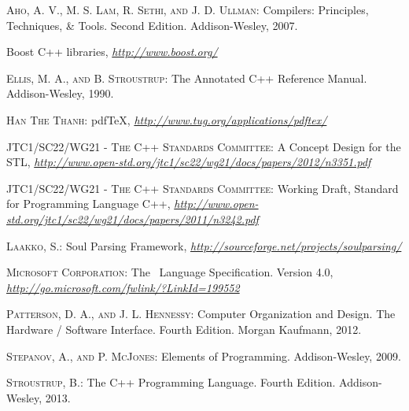 \documentclass[a4paper,oneside,11pt]{article}
\begin{document}
\begin{thebibliography}{13}

 \textsc{Aho, A. V., M. S. Lam, R. Sethi, and J. D. Ullman}:
Compilers: Principles, Techniques, \& Tools. Second Edition. Addison-Wesley, 2007.

 Boost C++ libraries,
\textit{\url{http://www.boost.org/}}

 \textsc{Ellis, M. A., and B. Stroustrup}:
The Annotated C++ Reference Manual. Addison-Wesley, 1990.

 \textsc{Han The Thanh}:
pdf\TeX, \textit{\url{http://www.tug.org/applications/pdftex/}}

 \textsc{JTC1/SC22/WG21 - The C++ Standards Committee}:
A Concept Design for the STL,
\textit{\url{http://www.open-std.org/jtc1/sc22/wg21/docs/papers/2012/n3351.pdf}}

 \textsc{JTC1/SC22/WG21 - The C++ Standards Committee}:
Working Draft, Standard for Programming Language C++,
\textit{\url{http://www.open-std.org/jtc1/sc22/wg21/docs/papers/2011/n3242.pdf}}

 \textsc{Laakko, S.}:
Soul Parsing Framework,
\textit{\url{http://sourceforge.net/projects/soulparsing/}}

 \textsc{Microsoft Corporation}:
The \csharp\ Language Specification. Version 4.0,
\textit{\url{http://go.microsoft.com/fwlink/?LinkId=199552}}

 \textsc{Patterson, D. A., and J. L. Hennessy}:
Computer Organization and Design. The Hardware / Software Interface. Fourth Edition.
Morgan Kaufmann, 2012.

 \textsc{Stepanov, A., and P. McJones}:
Elements of Programming. Addison-Wesley, 2009.

 \textsc{Stroustrup, B.}:
The C++ Programming Language. Fourth Edition. Addison-Wesley, 2013.

\end{thebibliography}
\end{document}
